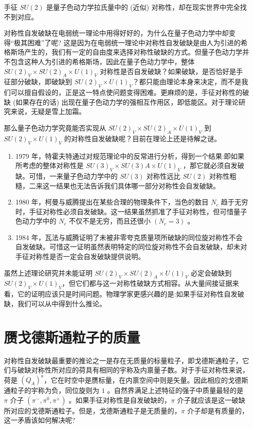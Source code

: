手征 $SU(2)$ 是量子色动力学拉氏量中的 (近似) 对称性，却在现实世界中完全找不到对应。

对称性自发破缺在电弱统一理论中用得好好的，为什么在量子色动力学中却变得“极其困难”了呢? 这是因为在电弱统一理论中对称性自发破缺是由人为引进的希格斯场产生的，我们有一定的自由度来选择对称性破缺的方式。但量子色动力学并不包含这种人为引进的希格斯场，因此在量子色动力学中，整体 $SU(2)_V \times SU(2)_A \times U(1)_V$ 对称性是否自发破缺？如果破缺，是否恰好是手征部分破缺，即破缺到 $SU(2)_V \times U(1)_V$？都只能由理论本身来决定，而不是我们可以擅自假设的，正是这一特点使问题变得困难。更麻烦的是，手征对称性的破缺 (如果存在的话) 出现在量子色动力学的强相互作用区，即低能区。对于理论研究来说，无疑是雪上加霜。

那么量子色动力学究竟能否实现从 $SU(2)_V \times SU(2)_A \times U(1)_V$ 到 $SU(2)_V \times U(1)_V$ 的对称性自发破缺呢？目前在理论上还是待解之谜。

\begin{enumerate}
    \item 1979 年，特霍夫特通过对规范理论中的反常进行分析，得到一个结果:即如果所考虑的整体对称性是 $SU(3)_V \times S U (3) A \times U(1)_V$ ，那它就必须自发破缺。可惜，一来量子色动力学中的 $SU(3)$ 对称性远比 $SU(2)$ 对称性粗糙，二来这一结果也无法告诉我们具体哪一部分对称性会自发破缺。
    \item 1980 年，柯曼与威腾提出在某些合理的物理条件下，当色的数目 $N_c$ 趋于无穷时，手征对称性必须自发破缺。这一结果虽然抓准了手征对称性，但可惜量子色动力学中的 $N_c$ 不仅不是无穷，而且还很小 $(N_c=3)$ 。
    \item 1984 年，瓦法与威腾证明了未被非零夸克质量项所破缺的同位旋对称性不会自发破缺。可惜这一证明虽然表明特定的同位旋对称性不会自发破缺，却未对手征对称性是否一定会自发破缺提供说明。
\end{enumerate}

虽然上述理论研究并未能证明 $SU(2)_V \times SU(2)_A \times U(1)_V$ 必定会破缺到 $SU(2)_V \times U(1)_V$，但它们都与这一对称性破缺方式相容。从大量间接证据来看，它的证明应该只是时间问题。物理学家更感兴趣的是:如果手征对称性自发破缺，我们可以从中得到什么推论。

\section{赝戈德斯通粒子的质量}

对称性自发破缺最重要的推论之一是存在无质量的标量粒子，即戈德斯通粒子，它们与破缺对称性所对应的荷具有相同的宇称及内禀量子数。对于手征对称性来说，荷是 $(Q_A)^a$，它在时空中是赝标量，在内禀空间中则是矢量。因此相应的戈德斯通粒子的宇称为负，同位旋则为 $1$ 。自然界满足上述特征的强子中质量最轻的是 $\pi$ 介子 $(\pi^-, \pi^0, \pi^+)$ 。如果手征对称性是自发破缺的，$\pi$ 介子就应该是这一破缺所对应的戈德斯通粒子。但是，戈德斯通粒子是无质量的，$\pi$ 介子却是有质量的，这一矛盾该如何解决呢?


